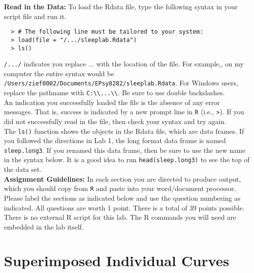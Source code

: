 \documentclass[]{article}
\begin{document}
\noindent\textbf{Read in the Data:} To load the Rdata file, type the following syntax in your script file and run it.

\begin{verbatim}
  > # The following line must be tailored to your system:
  > load(file = "/.../sleeplab.Rdata")
  > ls()
\end{verbatim}

\noindent \verb,/.../, indicates you replace $\ldots$ with the location of the file. For example,, on my computer the entire syntax would be \texttt{/Users/zief0002/Documents/EPsy8282/sl\allowbreak eeplab.Rdata}. For Windows users, replace the pathname with \verb,C:\\...\\,. Be sure to use double backslashes. \\
\linebreak
An indication you successfully loaded the file is the absence of any error messages. That is,
success is indicated by a new prompt line in \texttt{R} (i.e., \texttt{>}). If you did not
successfully read in the file, then check your syntax and try again. \\
\linebreak
The \texttt{ls()} function shows the objects in the Rdata file, which are data frames. If you
followed the directions in Lab 1, the long format data frame is named \texttt{sleep.long3}. If you renamed this data frame, then be sure to use the new name in the syntax below. It is a good idea to run \texttt{head(sleep.long3)} to see the top of the data set.\\
\linebreak
\textbf{Assignment Guidelines:} In each section you are directed to produce output, which you should copy from \texttt{R} and paste into your word/document processor. Please label the sections as indicated below and use the question numbering as indicated. All questions are worth 1 point. There is a total of 39 points possible. There is no external R script for this lab. The R commands you will need are embedded in the lab itself.

\pagebreak

%
%

\section*{Superimposed Individual Curves} 
 
\end{document}
